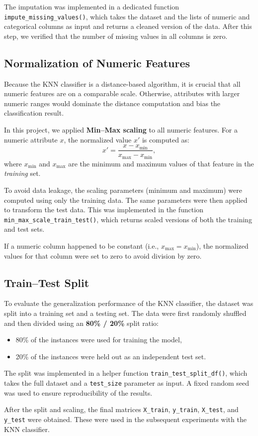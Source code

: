The imputation was implemented in a dedicated function \texttt{impute\_missing\_values()}, which
takes the dataset and the lists of numeric and categorical columns as input and returns a cleaned
version of the data. After this step, we verified that the number of missing values in all columns
is zero.

\subsection{Normalization of Numeric Features}
Because the KNN classifier is a distance-based algorithm, it is crucial that all numeric features
are on a comparable scale. Otherwise, attributes with larger numeric ranges would dominate the
distance computation and bias the classification result.

In this project, we applied \textbf{Min--Max scaling} to all numeric features. For a numeric
attribute $x$, the normalized value $x'$ is computed as:
\begin{equation}
	x' = \frac{x - x_{\min}}{x_{\max} - x_{\min}},
\end{equation}
where $x_{\min}$ and $x_{\max}$ are the minimum and maximum values of that feature in the
\emph{training} set.

To avoid data leakage, the scaling parameters (minimum and maximum) were computed using only
the training data. The same parameters were then applied to transform the test data.
This was implemented in the function \texttt{min\_max\_scale\_train\_test()}, which returns
scaled versions of both the training and test sets.

If a numeric column happened to be constant (i.e., $x_{\max} = x_{\min}$), the normalized
values for that column were set to zero to avoid division by zero.

\subsection{Train--Test Split}
To evaluate the generalization performance of the KNN classifier, the dataset was split into
a training set and a testing set. The data were first randomly shuffled and then divided using
an \textbf{80\% / 20\%} split ratio:
\begin{itemize}
	\item 80\% of the instances were used for training the model,
	\item 20\% of the instances were held out as an independent test set.
\end{itemize}

The split was implemented in a helper function \texttt{train\_test\_split\_df()}, which takes
the full dataset and a \texttt{test\_size} parameter as input. A fixed random seed was used to
ensure reproducibility of the results.

After the split and scaling, the final matrices \texttt{X\_train}, \texttt{y\_train},
\texttt{X\_test}, and \texttt{y\_test} were obtained. These were used in the subsequent
experiments with the KNN classifier.